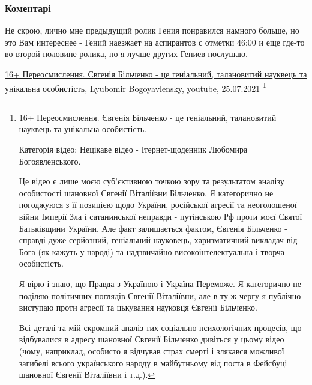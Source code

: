 
 
 
 
 
\subsubsection{Коментарі}

\begin{itemize}
 
Не скрою, лично мне предыдущий ролик Гения понравился намного больше, но это
Вам интереснее - Гений наезжает на аспирантов с отметки 46:00 и еще где-то во
второй половине ролика, но я лучше других Гениев послушаю.

\href{https://www.youtube.com/watch?v=QLVVoSIO-VE&t=2760s}{%
16+ Переосмислення. Євгенія Більченко - це геніальний, талановитий науквець та унікальна особистість, %
Lyubomir Bogoyavlensky, youtube, 25.07.2021%
}\footnote{
16+ Переосмислення. Євгенія Більченко - це геніальний, талановитий науквець та унікальна особистість.

Категорія відео: Нецікаве відео - Ітернет-щоденник Любомира Богоявленського.

Це відео є лише моєю суб'єктивною точкою зору та результатом аналізу
особистості шановної Євгенії Віталіївни Більченко. Я категорично не погоджуюся
з її позицією щодо України, російської агресії та неоголошеної війни Імперії
Зла і сатанинської неправди - путінською Рф проти моєї Святої Батьківщини
України. Але факт залишається фактом, Євгенія Більченко - справді дуже
серйозний, геніальний науковець, харизматичний викладач від Бога (як кажуть у
народі) та надзвичайно високоінтелектуальна і творча особистість.

Я вірю і знаю, що Правда з Україною і Україна Переможе. Я категорично не
поділяю політичних поглядів Євгенії Віталіївни, але в ту ж чергу я публічно
виступаю проти агресії та цькування науковця Євгенії Більченко. 

Всі деталі та мій скромний аналіз тих соціально-психологічних процесів, що
відбувалися в адресу шановної Євгенії Більченко дивіться у цьому відео (чому,
наприклад, особисто я відчував страх смерті і злякався можливої загибелі всього
українського народу в майбутньому від поста в Фейсбуці шановної Євгенії
Віталіївни і т.д.). 

}
\end{itemize}
